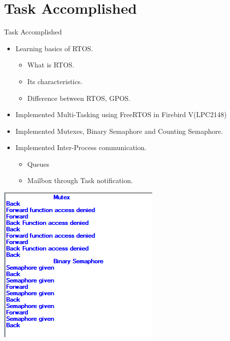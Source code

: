 \documentclass[10pt, a4paper]{beamer}
\begin{document}
\section{Task Accomplished}
\begin{frame}{Task Accomplished}
    \begin{itemize}
        \item Learning basics of RTOS.
            \begin{itemize}
            \item What is RTOS.
            \item Its characteristics.
            \item Difference between RTOS, GPOS.
            \end{itemize}
        \item Implemented Multi-Tasking using FreeRTOS in Firebird V(LPC2148)
        \item Implemented Mutexes, Binary Semaphore and Counting Semaphore.
         \item Implemented Inter-Process communication.
         
        \begin{itemize}
        \item  Queues
        \item  Mailbox through Task notification.
        \end{itemize}
    \end{itemize}
\end{frame}

\begin{frame}
\includegraphics{Binarymutex}
\end{frame}
\end{document}
